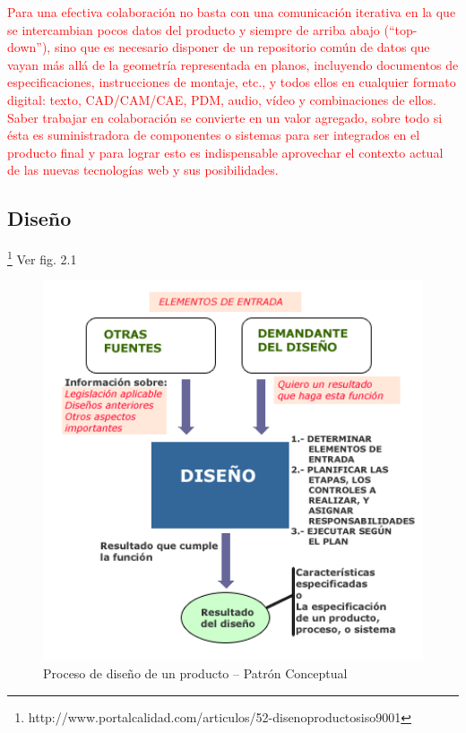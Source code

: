 \textcolor{red}{
Para una efectiva colaboración no basta con una comunicación iterativa en la que se intercambian pocos datos del producto y siempre de arriba abajo (“top-down”), sino que es necesario disponer de un repositorio común de datos que vayan más allá de la geometría representada en planos, incluyendo documentos de especificaciones, instrucciones de
montaje, etc., y todos ellos en cualquier formato digital: texto, CAD/CAM/CAE, PDM, audio, vídeo y combinaciones de ellos.
Saber trabajar en colaboración se convierte en un valor agregado, sobre todo si ésta es suministradora de componentes o sistemas para ser integrados en el producto final y para lograr esto es indispensable aprovechar el contexto actual de las nuevas tecnologías web y sus posibilidades. \cite{Ruiz} }

\subsection{Diseño}
  \footnote{http://www.portalcalidad.com/articulos/52-disenoproductosiso9001} Ver fig. 2.1

\begin{figure}
\centering
\includegraphics[width=12cm]{Img/CPD/0-CPD.png}
\caption[(optional short caption)]{\label{us_figure} Proceso de diseño de un producto – Patrón Conceptual}
\end{figure}



